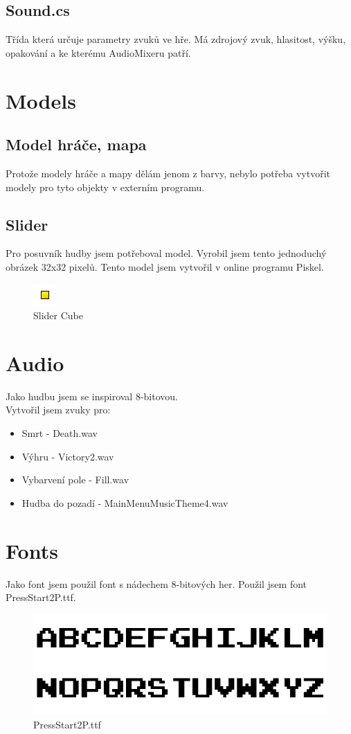 \documentclass[12pt,a4paper]{report}
\begin{document}
\subsection{Sound.cs}
Třída která určuje parametry zvuků ve hře.
Má zdrojový zvuk, hlasitost, výšku, opakování a ke kterému AudioMixeru patří.
\section{Models}
\subsection{Model hráče, mapa}
Protože modely hráče a mapy dělám jenom z barvy, nebylo potřeba vytvořit modely pro tyto objekty v externím programu.
\subsection{Slider}
Pro posuvník hudby jsem potřeboval model. Vyrobil jsem tento jednoduchý obrázek 32x32 pixelů.
Tento model jsem vytvořil v online programu Piskel.
\begin{figure}[H]\centering
    \includegraphics[]{images/SliderCube.png}
    \caption{Slider Cube}
\end{figure}
\section{Audio}
Jako hudbu jsem se inspiroval 8-bitovou. \\
Vytvořil jsem zvuky pro:
\begin{itemize}
    \item Smrt - Death.wav
    \item Výhru - Victory2.wav
    \item Vybarvení pole - Fill.wav
    \item Hudba do pozadí - MainMenuMusicTheme4.wav
\end{itemize}
\section{Fonts}
Jako font jsem použil font s nádechem 8-bitových her. Použil jsem font PressStart2P.ttf.
\begin{figure}[H]
    \centering
    \includegraphics[width=.8\textwidth]{images/Press-Start-2PA.png}
    \caption{PressStart2P.ttf}
\end{figure}
\end{document}
